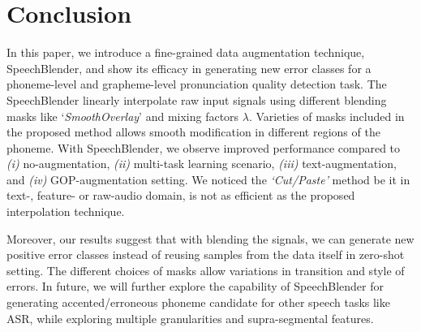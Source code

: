 \documentclass{INTERSPEECH2023}
\begin{document}
\section{Conclusion} \label{sec:conclusion}

In this paper, we introduce a fine-grained data augmentation technique, SpeechBlender, and show its efficacy in generating new error classes for a phoneme-level and grapheme-level pronunciation quality detection task. The SpeechBlender linearly interpolate raw input signals using different blending masks like `\textit{SmoothOverlay}' and mixing factors $\lambda$. Varieties of masks included in the proposed method allows smooth modification in different regions of the phoneme.  
With SpeechBlender, we observe improved performance compared to \textit{(i)} no-augmentation, \textit{(ii)} multi-task learning scenario, \textit{(iii)} text-augmentation, and \textit{(iv)} GOP-augmentation setting. We noticed the \textit{`Cut/Paste'} method be it in text-, feature- or raw-audio domain, is not as efficient as the proposed interpolation technique. 



Moreover, our results suggest that with blending the signals, we can generate new positive error classes instead of reusing samples from the data itself in zero-shot setting. The different choices of masks allow variations in transition and style of errors. In future, we will further explore the capability of SpeechBlender for generating accented/erroneous phoneme candidate for other speech tasks like ASR, while exploring multiple granularities and supra-segmental features.





\end{document}
